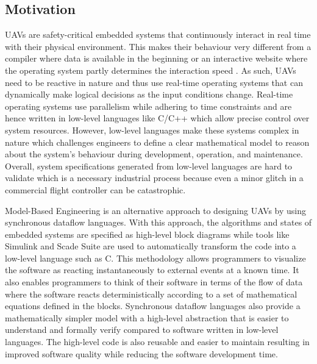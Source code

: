 \documentclass[10pt, a4paper]{article}
\begin{document}
    \subsection{Motivation}
    UAVs are safety-critical embedded systems that continuously interact in real time with their physical environment. This makes their behaviour very different from a compiler where data is available in the beginning or an interactive website where the operating system partly determines the interaction speed \cite{article:lustre-paper}. As such, UAVs need to be reactive in nature and thus use real-time operating systems that can dynamically make logical decisions as the input conditions change. Real-time operating systems use parallelism while adhering to time constraints and are hence written in low-level languages like C/C++ which allow precise control over system resources. However, low-level languages make these systems complex in nature which challenges engineers to define a clear mathematical model to reason about the system's behaviour during development, operation, and maintenance. Overall, system specifications generated from low-level languages are hard to validate which is a necessary industrial process because even a minor glitch in a commercial flight controller can be catastrophic.

    Model-Based Engineering is an alternative approach to designing UAVs by using synchronous dataflow languages. With this approach, the algorithms and states of embedded systems are specified as high-level block diagrams while tools like Simulink and Scade Suite \cite{web:Scade-Suite} are used to automatically transform the code into a low-level language such as C. This methodology allows programmers to visualize the software as reacting instantaneously to external events at a known time. It also enables programmers to think of their software in terms of the flow of data where the software reacts deterministically according to a set of mathematical equations defined in the blocks. Synchronous dataflow languages also provide a mathematically simpler model with a high-level abstraction that is easier to understand and formally verify compared to software written in low-level languages. The high-level code is also reusable and easier to maintain resulting in improved software quality while reducing the software development time.
\end{document}
